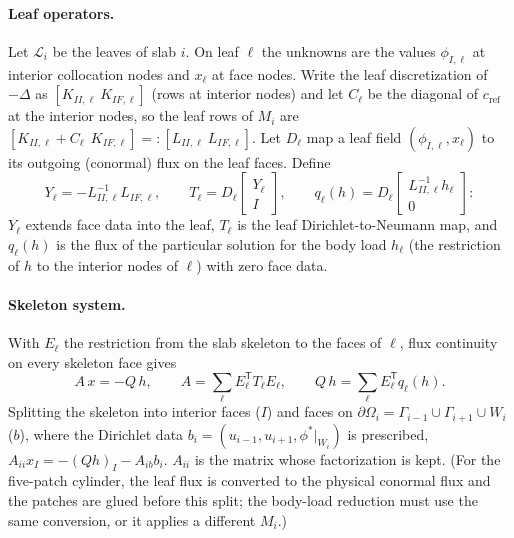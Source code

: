 \documentclass[11pt,a4paper]{article}
\theoremstyle{remark}\newtheorem{remark}{Remark}
\newcommand{\cR}{c_{\mathrm{ref}}}
\begin{document}
\paragraph{Leaf operators.} Let $\mathcal L_i$ be the leaves of slab $i$. On
leaf $\ell$ the unknowns are the values $\phi_{I,\ell}$ at interior collocation
nodes and $x_\ell$ at face nodes. Write the leaf discretization of $-\Delta$ as
$[K_{II,\ell}\ K_{IF,\ell}]$ (rows at interior nodes) and let $C_\ell$ be the
diagonal of $\cR$ at the interior nodes, so the leaf rows of $M_i$ are
$[K_{II,\ell}+C_\ell\ \ K_{IF,\ell}]=:[L_{II,\ell}\ L_{IF,\ell}]$. Let $D_\ell$
map a leaf field $(\phi_{I,\ell},x_\ell)$ to its outgoing (conormal) flux on
the leaf faces. Define
\begin{equation}\label{eq:leafops}
  Y_\ell=-L_{II,\ell}^{-1}L_{IF,\ell},\qquad
  T_\ell=D_\ell\begin{bmatrix}Y_\ell\\ I\end{bmatrix},\qquad
  q_\ell(h)=D_\ell\begin{bmatrix}L_{II,\ell}^{-1}h_\ell\\ 0\end{bmatrix}:
\end{equation}
$Y_\ell$ extends face data into the leaf, $T_\ell$ is the leaf
Dirichlet-to-Neumann map, and $q_\ell(h)$ is the flux of the particular
solution for the body load $h_\ell$ (the restriction of $h$ to the interior
nodes of $\ell$) with zero face data.

\paragraph{Skeleton system.} With $E_\ell$ the restriction from the slab
skeleton to the faces of $\ell$, flux continuity on every skeleton face gives
\begin{equation}\label{eq:skel}
  A\,x=-Q\,h,\qquad A=\sum_\ell E_\ell^{\mathsf T}T_\ell E_\ell,\qquad
  Q\,h=\sum_\ell E_\ell^{\mathsf T}q_\ell(h).
\end{equation}
Splitting the skeleton into interior faces ($I$) and faces on
$\partial\Omega_i=\Gamma_{i-1}\cup\Gamma_{i+1}\cup W_i$ ($b$), where the
Dirichlet data $b_i=(u_{i-1},u_{i+1},\phi^*|_{W_i})$ is prescribed,
$A_{ii}x_I=-(Qh)_I-A_{ib}b_i$. $A_{ii}$ is the matrix whose factorization is
kept. (For the five-patch cylinder, the leaf flux is converted to the physical
conormal flux and the patches are glued before this split; the body-load
reduction must use the same conversion, or it applies a different $M_i$.)
\end{document}

